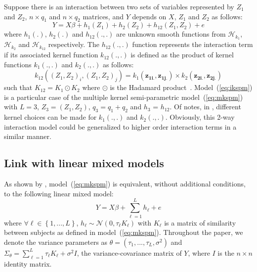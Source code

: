 Suppose there is an interaction between two sets of variables represented by $Z_1$ and $Z_2$,  $n \times q_1$ and $n \times q_2$ matrices, and $Y$ depends on $X$, $Z_1$ and $Z_2$ as follows:
\begin{equation} \label{eq:ikspm}
Y = X\beta + h_1(Z_1) + h_2(Z_2) + h_{12}(Z_1, Z_2) + e
\end{equation}
where $h_1(.)$, $h_2(.)$ and $h_{12}(.,.)$ are unknown smooth functions from $\mathcal{H}_{k_1}$, $\mathcal{H}_{k_2}$ and $\mathcal{H}_{k_{12}}$ respectively. The $h_{12}(.,.)$ function represents the interaction term if its associated kernel function $k_{12}(.,.)$ is defined as the product of kernel functions $k_1(.,.)$ and $k_2(.,.)$ as follows:
\begin{equation}
\label{eq:inter}
k_{12}\left((Z_1, Z_2)_i, (Z_1, Z_2)_j\right) = k_1(\mathbf{z_{1i.}}, \mathbf{z_{1j.}}) \times k_2(\mathbf{z_{2i.}}, \mathbf{z_{2j.}})
\end{equation}
such that $K_{12} = K_1 \odot K_2 $ where $\odot$ is the Hadamard product~\citep{ge2015kernel}. Model~(\ref{eq:ikspm}) is a particular case of the multiple kernel semi-parametric model~(\ref{eq:mkspm}) with $L=3$, $Z_3 = (Z_1, Z_2)$, $q_3 = q_1 + q_2$ and $h_{3}$ = $h_{12}$. Of notes, in , different kernel choices can be made for $k_1(.,.)$ and $k_2(.,.)$. Obviously, this 2-way interaction model could be generalized to higher order interaction terms in a similar manner.





\subsection{Link with linear mixed models} \label{sec:models-notations-lme}

As shown by \cite{liu2007semiparametric}, model~(\ref{eq:mkspm}) is equivalent, without additional conditions, to the following linear mixed model:
\begin{equation} \label{eq:lmm}
Y = X\beta + \sum\limits_{\ell = 1}^L h_{\ell} + e
\end{equation}
where $\forall \ell \in \left\lbrace 1,...,L\right\rbrace$, $h_{\ell} \sim \mathcal{N}(0, \tau_{\ell} K_{\ell})$ with %
$K_{\ell}$ is a matrix of similarity between subjects as defined in model~(\ref{eq:mkspm}). Throughout the paper, we denote the variance parameters as $\theta = (\tau_{1}, ..., \tau_L, \sigma^2)$  and $\Sigma_{\theta} = \sum\limits_{\ell = 1}^L \tau_{\ell}K_{\ell} + \sigma^2 I$, the variance-covariance matrix of $Y$, where $I$ is the $n \times n$ identity matrix.


